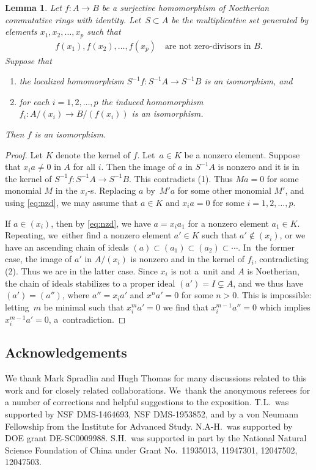 \documentclass[10pt,a4paper]{amsart}
\numberwithin{equation}{section}
\newtheorem{Lemma}[Theorem]{Lemma}
\begin{document}
\begin{Lemma}\label{lem:ringiso}
Let $f\colon A \to B$ be a surjective homomorphism of Noetherian commutative rings with identity. Let~$S \subset A$ be the multiplicative set generated by elements $x_1,x_2,\dots,x_p$ such that
\begin{gather}\label{eq:nzd}
f(x_1),f(x_2),\dots,f(x_p)\quad \text{are not zero-divisors in $B$}.
\end{gather}
Suppose that
\begin{enumerate}\itemsep=0pt
\item[$(1)$]
the localized homomorphism $S^{-1} f\colon S^{-1}A \to S^{-1}B$ is an isomorphism, and
\item[$(2)$]
for each $i=1,2,\dots,p$ the induced homomorphism $f_i\colon A/(x_i) \to B/(f(x_i))$ is an isomorphism.
\end{enumerate}
Then $f$ is an isomorphism.
\end{Lemma}
\begin{proof}
Let $K$ denote the kernel of $f$. Let~$a \in K$ be a nonzero element. Suppose that $x_i a \neq 0$ in $A$ for all $i$. Then the image of $a$ in $S^{-1}A$ is nonzero and it is in the kernel of $S^{-1} f\colon S^{-1}A \allowbreak\to S^{-1}B$. This contradicts (1). Thus $M a = 0$ for some monomial $M$ in the $x_i$-s. Replacing $a$ by~$M'a$ for some other monomial $M'$, and using \eqref{eq:nzd}, we may assume that $a \in K$ and $x_ia=0$ for some $i =1,2,\dots,p$.

If $a \in (x_i)$, then by \eqref{eq:nzd}, we have $a = x_i a_1$ for a nonzero element $a_1 \in K$. Repeating, we~either find a nonzero element $a' \in K$ such that $a' \notin (x_i)$, or we have an ascending chain of ideals $(a) \subset (a_1) \subset (a_2) \subset \cdots$. In~the former case, the image of $a'$ in $A/(x_i)$ is nonzero and in the kernel of $f_i$, contradicting (2). Thus we are in the latter case. Since $x_i$ is not a~unit and $A$ is Noetherian, the chain of ideals stabilizes to a proper ideal $(a') = I \subsetneq A$, and we thus have $(a') = (a'')$, where $a'' = x_i a'$ and $x^n a' = 0$ for some $n > 0$. This is impossible: letting~$m$ be minimal such that $x_i^m a' = 0$ we find that $x_i^{m-1} a'' =0$ which implies $x_i^{m-1} a' = 0$, a~contradiction.
\end{proof}

\subsection*{Acknowledgements} We thank Mark Spradlin and Hugh Thomas for many discussions related to this work and for closely related collaborations. We~thank the anonymous referees for a number of corrections and helpful suggestions to the exposition. T.L.\ was supported
by NSF DMS-1464693, NSF DMS-1953852, and by a von Neumann Fellowship from the Institute for Advanced Study.
N.A-H.\ was supported by DOE grant DE-SC0009988. S.H.\ was supported in part by the National Natural Science Foundation of China under Grant No.\ 11935013, 11947301, 12047502, 12047503.
\end{document}
